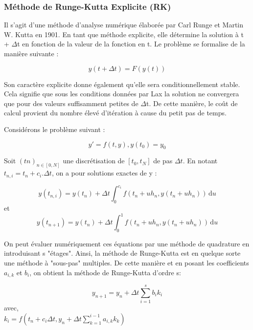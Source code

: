 \subsubsection{Méthode de Runge-Kutta Explicite (RK)}

Il s'agit d'une méthode d'analyse numérique élaborée par Carl Runge et Martin W. Kutta en 1901.
En tant que méthode explicite, elle détermine la solution à t +  $\Delta$t en fonction de la valeur de la fonction en t. Le problème se formalise de la manière suivante :

\begin{equation}
    y(t + \Delta t) = F(y(t))
\end{equation}

Son caractère explicite donne également qu'elle sera conditionnellement stable. Cela signifie que sous les conditions données par Lax la solution ne convergera que pour des valeurs suffisamment petites de $\Delta$t. De cette manière, le coût de calcul provient du nombre élevé d'itération à cause du petit pas de temps.

Considérons le problème suivant :

\begin{equation}
    y' = f(t, y),    y(t_0) = y_0
\end{equation}

Soit $(tn)_{n \in [0, N]}$ une discrétisation de $[t_0, t_N]$ de pas $\Delta t$. En notant $t_{n,i} = t_n + c_i . \Delta t$, on a pour solutions exactes de y :

\begin{equation}
    y(t_{n,i}) = y(t_n) + \Delta t \int_{0}^{c_i} f(t_n + uh_n, y(t_n + uh_n)) \, \mathrm{d}u
\end{equation}
et
\begin{equation}
    y(t_{n + 1}) = y(t_n) + \Delta t \int_{0}^{1} f(t_n + uh_n, y(t_n + uh_n)) \, \mathrm{d}u
\end{equation}

On peut évaluer numériquement ces équations par une méthode de quadrature en introduisant s "étages". Ainsi, la méthode de Runge-Kutta est en quelque sorte une méthode à "sous-pas" multiples. De cette manière et en posant les coefficients $a_{i, k}$ et $b_i$,  on obtient la méthode de Runge-Kutta d'ordre s:

\begin{equation}
    y_{n+1} = y_n + \Delta t \sum_{i=1}^{s} b_ik_i
\end{equation}
avec,\\
    $k_i = f(t_n + c_i\Delta t, y_n + \Delta t \sum_{k=1}^{i-1} a_{i,k}k_k)$

